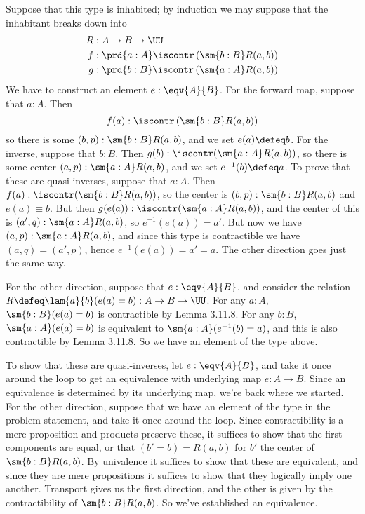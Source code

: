  \soln
Suppose that this type is inhabited; by induction we may suppose that the
inhabitant breaks down into
\begin{align*}
  R &: A \to B \to \UU \\
  f &: \prd{a:A} \iscontr\left(\sm{b:B}R(a, b)\right) \\
  g &: \prd{b:B} \iscontr\left(\sm{a:A}R(a, b)\right)
\end{align*}
We have to construct an element $e : \eqv{A}{B}$.  For the forward map, suppose
that $a : A$.  Then
\[
  f(a) : \iscontr\left(\sm{b:B}R(a, b)\right)
\]
so there is some $(b, p) : \sm{b:B}R(a,b)$, and we set $e(a) \defeq b$.  For
the inverse, suppose that $b:B$.  Then $g(b) : \iscontr(\sm{a:A}R(a, b))$, so
there is some center $(a, p) : \sm{a:A}R(a,b)$, and we set $e^{-1}(b) \defeq
a$.  To prove that these are quasi-inverses, suppose that $a : A$.  Then $f(a)
: \iscontr(\sm{b:B}R(a,b))$, so the center is $(b, p) : \sm{b:B}R(a,b)$ and
$e(a) \equiv b$.  But then $g(e(a)) : \iscontr(\sm{a:A}R(a, b))$, and the
center of this is $(a', q) : \sm{a:A}R(a,b)$, so $e^{-1}(e(a)) = a'$.  But
now we have $(a, p) : \sm{a:A}R(a, b)$, and since this type is contractible we
have $(a, q) = (a', p)$, hence $e^{-1}(e(a)) = a' = a$.  The other direction
goes just the same way.


For the other direction, suppose that $e : \eqv{A}{B}$, and consider the
relation $R \defeq \lam{a}{b}(e(a) = b) : A \to B \to \UU$.  For any $a : A$,
$\sm{b:B}(e(a) = b)$ is contractible by Lemma 3.11.8.  For any $b:B$,
$\sm{a:A}(e(a) = b)$ is equivalent to $\sm{a:A}(e^{-1}(b) = a)$, and this is
also contractible by Lemma 3.11.8.  So we have an element of the type above.


To show that these are quasi-inverses, let $e : \eqv{A}{B}$, and take it once
around the loop to get an equivalence with underlying map $e : A \to B$.  Since
an equivalence is determined by its underlying map, we're back where we
started.  For the other direction, suppose that we have an element of the type
in the problem statement, and take it once around the loop.  Since
contractibility is a mere proposition and products preserve these, it suffices
to show that the first components are equal, or that $(b' = b) = R(a, b)$ for
$b'$ the center of $\sm{b:B}R(a, b)$.  By univalence it suffices to show that
these are equivalent, and since they are mere propositions it suffices to show
that they logically imply one another.  Transport gives us the first
direction, and the other is given by the contractibility of $\sm{b:B}R(a, b)$.
So we've established an equivalence.


